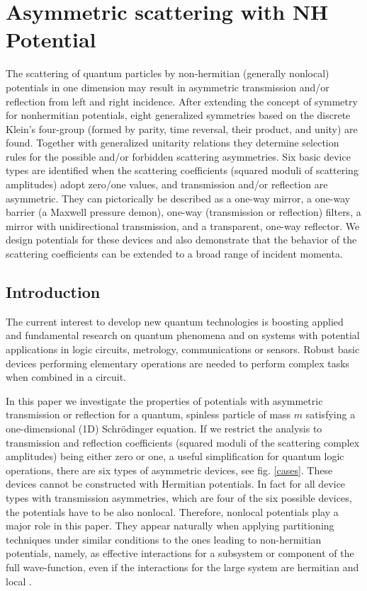 
\chapter{Asymmetric scattering with NH Potential}
\label{ChapterAsymmetricScattering}
%
The scattering of quantum particles by non-hermitian (generally nonlocal)  potentials in one dimension
may result in asymmetric transmission and/or reflection from left and right incidence.
After extending the concept of symmetry for nonhermitian potentials, eight generalized symmetries based on the discrete  Klein's four-group
(formed by parity, time reversal, their product, and unity) are found. Together with generalized unitarity relations they determine
selection rules for the possible and/or forbidden scattering asymmetries.
Six basic device types are
identified when the scattering coefficients (squared moduli of scattering amplitudes)
adopt zero/one values, and transmission and/or reflection are asymmetric.
They can pictorically be described as a
one-way mirror, a one-way barrier (a Maxwell  pressure demon), one-way (transmission or reflection) filters,
a mirror with unidirectional transmission, and a transparent, one-way reflector. We design potentials
for these devices and also demonstrate that the  behavior of the scattering
coefficients can be extended to a broad range of incident momenta.
%
\newpage
%
\section{Introduction}

The current interest to develop new quantum technologies is boosting applied and fundamental
research on quantum phenomena and on systems with potential applications in logic circuits, metrology, communications or sensors.
Robust basic devices performing elementary operations are needed to perform
complex tasks when combined in a circuit.

In this paper we investigate the properties of potentials with asymmetric
transmission or reflection for a quantum, spinless particle of mass $m$ satisfying a one-dimensional (1D) Schr\"odinger equation. If we restrict the analysis  to  transmission and reflection coefficients (squared moduli
of the scattering complex amplitudes) being  either zero or one, a useful simplification for quantum logic operations,
there are six types of asymmetric devices, see fig. \ref{cases}.
These devices cannot be constructed with Hermitian potentials. In fact for all device types with transmission asymmetries,
which are four of the six possible devices,
the potentials have to be also nonlocal. Therefore, nonlocal potentials play a major role in this paper. They appear naturally when applying partitioning techniques
under similar conditions to the
ones leading to non-hermitian  potentials, namely, as effective interactions for a subsystem or component of the full wave-function,
even if the interactions for the large system are hermitian and local \cite{Muga2004}.

